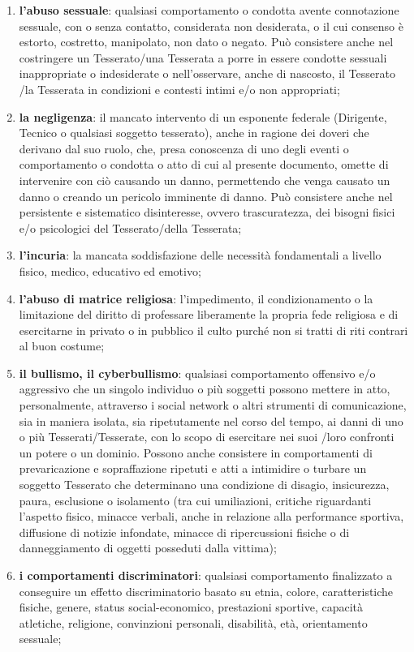\documentclass{djtsdoc}
\begin{document}
\begin{enumerate}
\begin{enumerate}
			\item \textbf{l'abuso sessuale}: qualsiasi comportamento o condotta avente connotazione sessuale, con o	senza contatto, considerata non desiderata, o il cui consenso è estorto, costretto, manipolato,	non dato o negato. Può consistere anche nel costringere un Tesserato/una Tesserata a porre in	essere condotte sessuali inappropriate o indesiderate o nell'osservare, anche di nascosto, il	Tesserato /la Tesserata in condizioni e contesti intimi e/o non appropriati;
			\item \textbf{la negligenza}: il mancato intervento di un esponente federale (Dirigente, Tecnico o qualsiasi soggetto tesserato), anche in ragione dei doveri che derivano dal suo ruolo, che, presa	conoscenza di uno degli eventi o comportamento o condotta o atto di cui al presente documento, omette di intervenire con ciò causando un danno, permettendo che venga causato	un danno o creando un pericolo imminente di danno. Può consistere anche nel persistente e sistematico disinteresse, ovvero trascuratezza, dei bisogni fisici e/o psicologici del Tesserato/della Tesserata;
			\item \textbf{l'incuria}: la mancata soddisfazione delle necessità fondamentali a livello fisico, medico,	educativo ed emotivo;
			\item \textbf{l'abuso di matrice religiosa}: l'impedimento, il condizionamento o la limitazione del diritto di professare liberamente la propria fede religiosa e di esercitarne in privato o in pubblico il culto purché non si tratti di riti contrari al buon costume;
			\item \textbf{il bullismo, il cyberbullismo}: qualsiasi comportamento offensivo e/o aggressivo che un	singolo individuo o più soggetti possono mettere in atto, personalmente, attraverso i social	network o altri strumenti di comunicazione, sia in maniera isolata, sia ripetutamente nel corso del tempo, ai danni di uno o più Tesserati/Tesserate, con lo scopo di esercitare nei suoi /loro confronti un potere o un dominio. Possono anche consistere in comportamenti di	prevaricazione e sopraffazione ripetuti e atti a intimidire o turbare un soggetto Tesserato che determinano una condizione di disagio, insicurezza, paura, esclusione o isolamento (tra cui umiliazioni, critiche riguardanti l'aspetto fisico, minacce verbali, anche in relazione alla performance sportiva, diffusione di notizie infondate, minacce di ripercussioni fisiche o di danneggiamento di oggetti posseduti dalla vittima);
			\item \textbf{i comportamenti discriminatori}: qualsiasi comportamento finalizzato a conseguire un effetto discriminatorio basato su etnia, colore, caratteristiche fisiche, genere, status social-economico, prestazioni sportive, capacità atletiche, religione, convinzioni personali, disabilità, età, orientamento sessuale;

\end{enumerate}
\end{enumerate}
\end{document}
